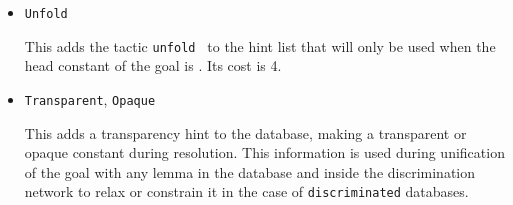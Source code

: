 \begin{coq_example*}
\begin{itemize}
  If {\ident} is an inductive type, this command adds all its
  constructors as hints of type \texttt{Resolve}. Then, when the
  conclusion of current goal has the form \texttt{({\ident} \dots)},
  \texttt{auto} will try to apply each constructor.



\item \texttt{Unfold} {\qualid}

  This adds the tactic {\tt unfold {\qualid}} to the hint list that
  will only be used when the head constant of the goal is \ident.  Its
  cost is 4.


\item \texttt{Transparent}, \texttt{Opaque} {\qualid}
\label{HintTransparency}

  This adds a transparency hint to the database, making {\tt {\qualid}}
  a transparent or opaque constant during resolution. This information
  is used during unification of the goal with any lemma in the database
  and inside the discrimination network to relax or constrain it in the
  case of \texttt{discriminated} databases.


\end{itemize}
\end{coq_example*}
